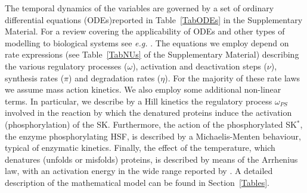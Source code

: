 \documentclass[oneside, 10pt, a4paper, twocolumn]{article}
\begin{document}
The temporal dynamics of the variables are governed by a set of ordinary differential equations (ODEs)reported in Table~\ref{TabODEs} in the Supplementary Material. 
For a review covering the applicability of ODEs and other types of modelling to biological systems see {\it e.g.} \cite{Pfau2011}. 
The equations we employ depend on rate expressions (see Table~\ref{TabNUs} of the Supplementary Material) describing the various regulatory processes ($\omega$), activation and deactivation steps ($\nu$), synthesis rates ($\pi$) and
degradation rates ($\eta$). 
For the majority of these rate laws we assume mass action kinetics. We also employ some additional non-linear terms. In particular, we describe by a Hill kinetics the regulatory process $\omega_{PS}$ involved in the reaction by which the denatured proteins induce the activation (phosphorylation) of the SK. Furthermore, the action of the phosphorylated SK$^*$, the enzyme phosphorylating HSF, is described by a Michaelis-Menten behaviour, typical of enzymatic kinetics. 
Finally, the effect of the temperature, which denatures (unfolds or misfolds) proteins, is described by means of the Arrhenius law, with an activation energy 
in the wide range reported by \cite{Bischof2006,He2003}. A detailed description of the mathematical model can be found in Section~\ref{Tables}.

\end{document}
